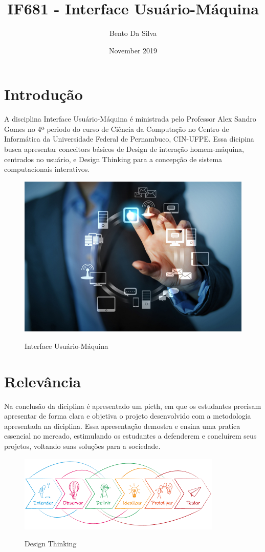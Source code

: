\documentclass{article}
\title{IF681 - Interface Usuário-Máquina}
\author{Bento Da Silva }
\date{November 2019}
\begin{document}
\maketitle
\section{Introdução}
    A disciplina Interface Usuário-Máquina é ministrada pelo Professor Alex Sandro Gomes no 4ª periodo do curso de Ciência da Computação no Centro de Informática da Universidade Federal de Pernambuco, CIN-UFPE. 
    Essa dicipina busca apresentar conceitors básicos de Design de interação homem-máquina, centrados no usuário, e Design Thinking para a concepção de sistema computacionais interativos.\cite{interface123disciplina}  

\begin{figure}[h!]
\centering
\includegraphics[scale=1.7]{interface-do-usuario.jpg}
\caption{Interface Usuário-Máquina}
\cite{interface123}
\label{fig:interface-do-usuario}
\end{figure}


\section{Relevância}
Na conclusão da diciplina é apresentado um picth, em que os estudantes precisam apresentar de forma clara e objetiva o projeto desenvolvido com a metodologia apresentada na diciplina. Essa apresentação demostra e ensina uma pratica essencial no mercado, estimulando os estudantes a defenderem e concluírem seus projetos, voltando suas soluções para a sociedade.  

\begin{figure}[h!]
\centering
\includegraphics[scale=0.9]{designThinking.png}
\caption{Design Thinking}
\cite{interface1234353Thinking}
\label{fig:designThinking}
\end{figure}
\end{document}
